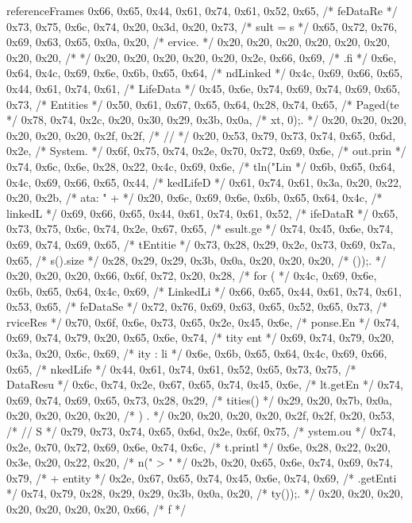 \begin{chunk}{referenceFrames}
{{{{{0x66, 0x65, 0x44, 0x61, 0x74, 0x61, 0x52, 0x65, /* feDataRe */
0x73, 0x75, 0x6c, 0x74, 0x20, 0x3d, 0x20, 0x73, /* sult = s */
0x65, 0x72, 0x76, 0x69, 0x63, 0x65, 0x0a, 0x20, /* ervice.  */
0x20, 0x20, 0x20, 0x20, 0x20, 0x20, 0x20, 0x20, /*          */
0x20, 0x20, 0x20, 0x20, 0x20, 0x2e, 0x66, 0x69, /*      .fi */
0x6e, 0x64, 0x4c, 0x69, 0x6e, 0x6b, 0x65, 0x64, /* ndLinked */
0x4c, 0x69, 0x66, 0x65, 0x44, 0x61, 0x74, 0x61, /* LifeData */
0x45, 0x6e, 0x74, 0x69, 0x74, 0x69, 0x65, 0x73, /* Entities */
0x50, 0x61, 0x67, 0x65, 0x64, 0x28, 0x74, 0x65, /* Paged(te */
0x78, 0x74, 0x2c, 0x20, 0x30, 0x29, 0x3b, 0x0a, /* xt, 0);. */
0x20, 0x20, 0x20, 0x20, 0x20, 0x20, 0x2f, 0x2f, /*       // */
0x20, 0x53, 0x79, 0x73, 0x74, 0x65, 0x6d, 0x2e, /*  System. */
0x6f, 0x75, 0x74, 0x2e, 0x70, 0x72, 0x69, 0x6e, /* out.prin */
0x74, 0x6c, 0x6e, 0x28, 0x22, 0x4c, 0x69, 0x6e, /* tln("Lin */
0x6b, 0x65, 0x64, 0x4c, 0x69, 0x66, 0x65, 0x44, /* kedLifeD */
0x61, 0x74, 0x61, 0x3a, 0x20, 0x22, 0x20, 0x2b, /* ata: " + */
0x20, 0x6c, 0x69, 0x6e, 0x6b, 0x65, 0x64, 0x4c, /*  linkedL */
0x69, 0x66, 0x65, 0x44, 0x61, 0x74, 0x61, 0x52, /* ifeDataR */
0x65, 0x73, 0x75, 0x6c, 0x74, 0x2e, 0x67, 0x65, /* esult.ge */
0x74, 0x45, 0x6e, 0x74, 0x69, 0x74, 0x69, 0x65, /* tEntitie */
0x73, 0x28, 0x29, 0x2e, 0x73, 0x69, 0x7a, 0x65, /* s().size */
0x28, 0x29, 0x29, 0x3b, 0x0a, 0x20, 0x20, 0x20, /* ());.    */
0x20, 0x20, 0x20, 0x66, 0x6f, 0x72, 0x20, 0x28, /*    for ( */
0x4c, 0x69, 0x6e, 0x6b, 0x65, 0x64, 0x4c, 0x69, /* LinkedLi */
0x66, 0x65, 0x44, 0x61, 0x74, 0x61, 0x53, 0x65, /* feDataSe */
0x72, 0x76, 0x69, 0x63, 0x65, 0x52, 0x65, 0x73, /* rviceRes */
0x70, 0x6f, 0x6e, 0x73, 0x65, 0x2e, 0x45, 0x6e, /* ponse.En */
0x74, 0x69, 0x74, 0x79, 0x20, 0x65, 0x6e, 0x74, /* tity ent */
0x69, 0x74, 0x79, 0x20, 0x3a, 0x20, 0x6c, 0x69, /* ity : li */
0x6e, 0x6b, 0x65, 0x64, 0x4c, 0x69, 0x66, 0x65, /* nkedLife */
0x44, 0x61, 0x74, 0x61, 0x52, 0x65, 0x73, 0x75, /* DataResu */
0x6c, 0x74, 0x2e, 0x67, 0x65, 0x74, 0x45, 0x6e, /* lt.getEn */
0x74, 0x69, 0x74, 0x69, 0x65, 0x73, 0x28, 0x29, /* tities() */
0x29, 0x20, 0x7b, 0x0a, 0x20, 0x20, 0x20, 0x20, /* ) {.     */
0x20, 0x20, 0x20, 0x20, 0x2f, 0x2f, 0x20, 0x53, /*     // S */
0x79, 0x73, 0x74, 0x65, 0x6d, 0x2e, 0x6f, 0x75, /* ystem.ou */
0x74, 0x2e, 0x70, 0x72, 0x69, 0x6e, 0x74, 0x6c, /* t.printl */
0x6e, 0x28, 0x22, 0x20, 0x3e, 0x20, 0x22, 0x20, /* n(" > "  */
0x2b, 0x20, 0x65, 0x6e, 0x74, 0x69, 0x74, 0x79, /* + entity */
0x2e, 0x67, 0x65, 0x74, 0x45, 0x6e, 0x74, 0x69, /* .getEnti */
0x74, 0x79, 0x28, 0x29, 0x29, 0x3b, 0x0a, 0x20, /* ty());.  */
0x20, 0x20, 0x20, 0x20, 0x20, 0x20, 0x20, 0x66, /*        f */
}}}}}}
\end{chunk}

